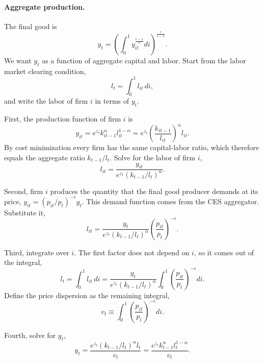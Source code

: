\documentclass[11pt]{article}
\begin{document}
\paragraph{Aggregate production.} The final good is
\begin{equation*}
y_t = \left( \int_0^1 y_{it}^{\frac{\epsilon-1}{\epsilon}} di \right)^{\frac{\epsilon}{\epsilon-1}} .
\end{equation*}
We want $y_t$ as a function of aggregate capital and labor. Start from the labor market clearing condition,
\begin{equation*}
l_t = \int_0^1 l_{it}\, di ,
\end{equation*}
and write the labor of firm $i$ in terms of $y_t$.

First, the production function of firm $i$ is
\begin{equation*}
y_{it} = e^{z_t} k_{it-1}^{\alpha} l_{it}^{1-\alpha} = e^{z_t} \left( \frac{k_{it-1}}{l_{it}} \right)^{\alpha} l_{it} .
\end{equation*}
By cost minimization every firm has the same capital-labor ratio, which therefore equals the aggregate ratio $k_{t-1}/l_t$. Solve for the labor of firm $i$,
\begin{equation*}
l_{it} = \frac{y_{it}}{e^{z_t} \left( k_{t-1}/l_t \right)^{\alpha}} .
\end{equation*}

Second, firm $i$ produces the quantity that the final good producer demands at its price, $y_{it} = (p_{it}/p_t)^{-\epsilon} y_t$. This demand function comes from the CES aggregator. Substitute it,
\begin{equation*}
l_{it} = \frac{y_t}{e^{z_t} \left( k_{t-1}/l_t \right)^{\alpha}} \left( \frac{p_{it}}{p_t} \right)^{-\epsilon} .
\end{equation*}

Third, integrate over $i$. The first factor does not depend on $i$, so it comes out of the integral,
\begin{equation*}
l_t = \int_0^1 l_{it}\, di = \frac{y_t}{e^{z_t} \left( k_{t-1}/l_t \right)^{\alpha}} \int_0^1 \left( \frac{p_{it}}{p_t} \right)^{-\epsilon} di .
\end{equation*}
Define the price dispersion as the remaining integral,
\begin{equation*}
v_t \equiv \int_0^1 \left( \frac{p_{it}}{p_t} \right)^{-\epsilon} di .
\end{equation*}

Fourth, solve for $y_t$,
\begin{equation*}
y_t = \frac{e^{z_t} \left( k_{t-1}/l_t \right)^{\alpha} l_t}{v_t} = \frac{e^{z_t} k_{t-1}^{\alpha} l_t^{1-\alpha}}{v_t} .
\end{equation*}
\end{document}
